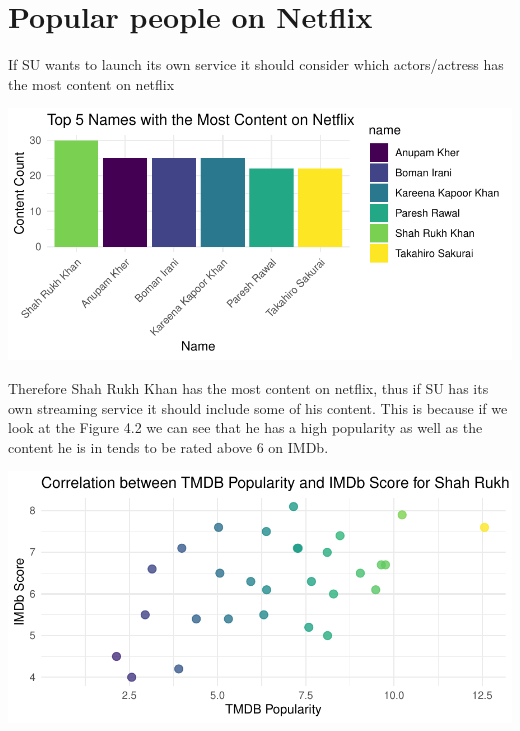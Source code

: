 \documentclass[12pt,preprint, authoryear]{elsarticle}
\let\origfigure\figure
\let\endorigfigure\endfigure
\renewenvironment{figure}[1][2] {
    \expandafter\origfigure\expandafter[H]
} {
    \endorigfigure
}
\numberwithin{equation}{section}
\numberwithin{figure}{section}
\numberwithin{table}{section}
\begin{document}
\hypertarget{popular-people-on-netflix}{%
\section{Popular people on Netflix~}\label{popular-people-on-netflix}}

If SU wants to launch its own service it should consider which
actors/actress has the most content on netflix

\begin{figure}[H]

{\centering \includegraphics{Q4_files/figure-latex/Figure6-1} 

}

\caption{Common Stars on Netflix  \label{Figure1}}\label{fig:Figure6}
\end{figure}

Therefore Shah Rukh Khan has the most content on netflix, thus if SU has
its own streaming service it should include some of his content. This is
because if we look at the Figure 4.2 we can see that he has a high
popularity as well as the content he is in tends to be rated above 6 on
IMDb.

\begin{figure}[H]

{\centering \includegraphics{Q4_files/figure-latex/Figure7-1} 

}

\caption{Correlation \label{Figure3}}\label{fig:Figure7}
\end{figure}
\end{document}
